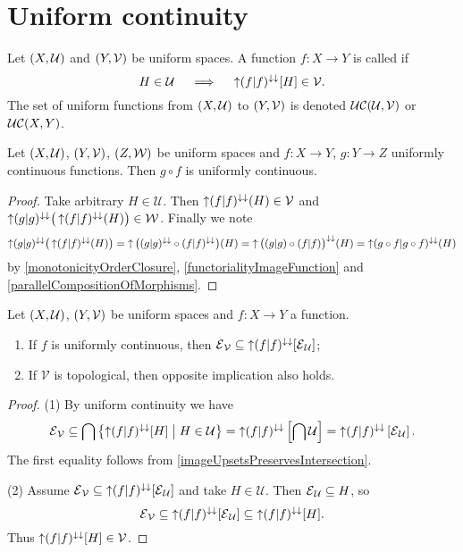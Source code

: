\section{Uniform continuity}
\begin{definition}
Let $\sSet{X,\mathcal{U}}$ and $\sSet{Y,\mathcal{V}}$ be uniform spaces. A function $f: X\to Y$ is called  if
\[ H\in \mathcal{U} \quad\implies\quad \operatorname{\uparrow} (f|f)^{\downarrow\downarrow}[H]\in \mathcal{V}. \]
The set of uniform functions from $\sSet{X,\mathcal{U}}$ to $\sSet{Y,\mathcal{V}}$ is denoted $\operatorname{\mathcal{UC}}(\mathcal{U}, \mathcal{V})$ or $\operatorname{\mathcal{UC}}(X,Y)$.
\end{definition}

\begin{lemma} \label{compositionUniformlyContinuousFunctions}
Let $\sSet{X,\mathcal{U}}$, $\sSet{Y,\mathcal{V}}$, $\sSet{Z, \mathcal{W}}$ be uniform spaces and $f:X\to Y$, $g:Y\to Z$ uniformly continuous functions. Then $g\circ f$ is uniformly continuous.
\end{lemma}
\begin{proof}
Take arbitrary $H \in \mathcal{U}$. Then $\operatorname{\uparrow} (f|f)^{\downarrow\downarrow}(H)\in \mathcal{V}$ and $\operatorname{\uparrow}(g|g)^{\downarrow\downarrow}\big(\operatorname{\uparrow} (f|f)^{\downarrow\downarrow}(H)\big) \in \mathcal{W}$. Finally we note
\[ \operatorname{\uparrow}(g|g)^{\downarrow\downarrow}\big(\operatorname{\uparrow} (f|f)^{\downarrow\downarrow}(H)\big) = \operatorname{\uparrow}\big((g|g)^{\downarrow\downarrow}\circ (f|f)^{\downarrow\downarrow}\big)(H) = \operatorname{\uparrow} \big((g|g)\circ (f|f)\big)^{\downarrow\downarrow}(H) = \operatorname{\uparrow} (g\circ f|g\circ f)^{\downarrow\downarrow}(H) \]
by \ref{monotonicityOrderClosure}, \ref{functorialityImageFunction} and \ref{parallelCompositionOfMorphisms}.
\end{proof}

\begin{proposition} \label{uniformContinuityEntourages}
Let $\sSet{X,\mathcal{U}}$, $\sSet{Y,\mathcal{V}}$ be uniform spaces and $f: X\to Y$ a function.
\begin{enumerate}
\item If $f$ is uniformly continuous, then $\operatorname{\mathcal{E}}_\mathcal{V} \subseteq \operatorname{\uparrow} (f|f)^{\downarrow\downarrow}[\operatorname{\mathcal{E}}_\mathcal{U}]$;
\item If $\mathcal{V}$ is topological, then opposite implication also holds.
\end{enumerate}
\end{proposition}
\begin{proof}
(1) By uniform continuity we have
\[ \entourage_\mathcal{V} \subseteq \bigcap\setbuilder{\upset (f|f)^{\imf\imf}[H]}{H\in \mathcal{U}} = \upset (f|f)^{\imf\imf}\left[\bigcap \mathcal{U}\right] = \upset (f|f)^{\imf\imf}\left[\entourage_\mathcal{U}\right]. \]
The first equality follows from \ref{imageUpsetsPreservesIntersection}.

(2) Assume $\operatorname{\mathcal{E}}_\mathcal{V} \subseteq \operatorname{\uparrow} (f|f)^{\downarrow\downarrow}[\operatorname{\mathcal{E}}_\mathcal{U}]$ and take $H\in \mathcal{U}$. Then $\operatorname{\mathcal{E}}_\mathcal{U}\subseteq H$, so
\[ \operatorname{\mathcal{E}}_\mathcal{V} \subseteq \operatorname{\uparrow} (f|f)^{\downarrow\downarrow}[\operatorname{\mathcal{E}}_\mathcal{U}] \subseteq \operatorname{\uparrow} (f|f)^{\downarrow\downarrow}[H]. \]
Thus $\operatorname{\uparrow} (f|f)^{\downarrow\downarrow}[H] \in\mathcal{V}$.
\end{proof}

